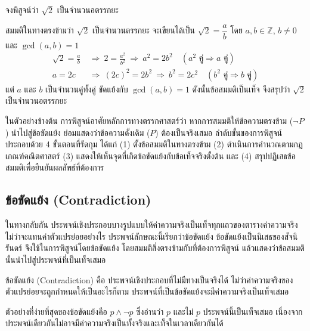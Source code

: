 \begin{ex}
\label{ex:proof-contradiction-sqrt2}
จงพิสูจน์ว่า $\sqrt{2}$ เป็นจำนวนอตรรกยะ
\end{ex}

\begin{solution}
สมมติในทางตรงข้ามว่า $\sqrt{2}$ เป็นจำนวนตรรกยะ จะเขียนได้เป็น $\sqrt{2} = \dfrac{a}{b}$ โดย $a,b \in \mathbb{Z}$, $b \neq 0$ และ $\gcd(a,b)=1$
\begin{align*}
\sqrt{2} = \frac{a}{b} \ &\Rightarrow\ 2 = \frac{a^2}{b^2} \ \Rightarrow\ a^2 = 2b^2 \quad (a^2 \text{ คู่} \Rightarrow a \text{ คู่})\\
a = 2c \ &\Rightarrow\ (2c)^2 = 2b^2 \ \Rightarrow\ b^2 = 2c^2 \quad (b^2 \text{ คู่} \Rightarrow b \text{ คู่})
\end{align*}
แต่ $a$ และ $b$ เป็นจำนวนคู่ทั้งคู่ ขัดแย้งกับ $\gcd(a,b)=1$ ดังนั้นข้อสมมติเป็นเท็จ จึงสรุปว่า $\sqrt{2}$ เป็นจำนวนอตรรกยะ \solhere
\end{solution}

ในตัวอย่างข้างต้น การพิสูจน์อาศัยหลักการทางตรรกศาสตร์ว่า หากการสมมติให้ข้อความตรงข้าม ($\neg P$) นำไปสู่ข้อขัดแย้ง ย่อมแสดงว่าข้อความดั้งเดิม ($P$) ต้องเป็นจริงเสมอ ลำดับขั้นของการพิสูจน์ประกอบด้วย 4 ขั้นตอนที่รัดกุม ได้แก่ (1) ตั้งข้อสมมติในทางตรงข้าม (2) ดำเนินการคำนวณตามกฎเกณฑ์คณิตศาสตร์ (3) แสดงให้เห็นจุดที่เกิดข้อขัดแย้งกับข้อเท็จจริงตั้งต้น และ (4) สรุปปฏิเสธข้อสมมติเพื่อยืนยันผลลัพธ์ที่ต้องการ

\subsection{ข้อขัดแย้ง (Contradiction)}
ในทางกลับกัน ประพจน์เชิงประกอบบางรูปแบบให้ค่าความจริงเป็นเท็จทุกแถวของตารางค่าความจริง ไม่ว่าจะแทนค่าตัวแปรย่อยอย่างไร ประพจน์ลักษณะนี้เรียกว่าข้อขัดแย้ง ข้อขัดแย้งเป็นนิเสธของสัจนิรันดร์ จึงใช้ในการพิสูจน์โดยข้อขัดแย้ง โดยสมมติสิ่งตรงข้ามกับที่ต้องการพิสูจน์ แล้วแสดงว่าข้อสมมตินั้นนำไปสู่ประพจน์ที่เป็นเท็จเสมอ~\parencite{velleman2019prove}

\begin{definition}[ข้อขัดแย้ง]
ข้อขัดแย้ง (Contradiction) คือ ประพจน์เชิงประกอบที่ไม่มีทางเป็นจริงได้ ไม่ว่าค่าความจริงของตัวแปรย่อยจะถูกกำหนดให้เป็นอะไรก็ตาม ประพจน์ที่เป็นข้อขัดแย้งจะมีค่าความจริงเป็นเท็จเสมอ
\end{definition}

ตัวอย่างที่ง่ายที่สุดของข้อขัดแย้งคือ $p \land \neg p$ ซึ่งอ่านว่า $p$ และไม่ $p$ ประพจน์นี้เป็นเท็จเสมอ เนื่องจากประพจน์เดียวกันไม่อาจมีค่าความจริงเป็นทั้งจริงและเท็จในเวลาเดียวกันได้


